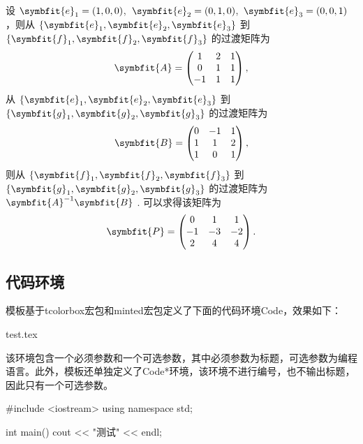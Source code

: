 \documentclass{gunote}
\begin{document}
\begin{Solve}
  设 $\symbfit{e}_1=(1,0,0)$,\ $\symbfit{e}_2=(0,1,0)$,\ $\symbfit{e}_3=(0,0,1)$ ，则从 $\{\symbfit{e}_1,\symbfit{e}_2,\symbfit{e}_3\}$ 到 $\{\symbfit{f}_1,\symbfit{f}_2,\symbfit{f}_3\}$ 的过渡矩阵为
  \[
    \symbfit{A}=\begin{pmatrix}
      1 & 2 & 1 \\
      0 & 1 & 1 \\
      -1& 1 & 1
    \end{pmatrix},
  \]
  从 $\{\symbfit{e}_1,\symbfit{e}_2,\symbfit{e}_3\}$ 到  $\{\symbfit{g}_1,\symbfit{g}_2,\symbfit{g}_3\}$ 的过渡矩阵为
  \[
    \symbfit{B}=\begin{pmatrix}
      0 & -1 & 1 \\
      1 & 1  & 2 \\
      1 & 0  & 1
    \end{pmatrix},
  \]
  则从 $\{\symbfit{f}_1,\symbfit{f}_2,\symbfit{f}_3\}$ 到  $\{\symbfit{g}_1,\symbfit{g}_2,\symbfit{g}_3\}$ 的过渡矩阵为 $\symbfit{A}^{-1}\symbfit{B}$ . 可以求得该矩阵为
  \[
    \symbfit{P}=\begin{pmatrix}
      0 & 1 & 1 \\
      -1&-3 &-2 \\
      2 & 4 & 4
    \end{pmatrix}.
  \]
\end{Solve}
\subsection{代码环境}
模板基于\textsf{tcolorbox}宏包和\textsf{minted}宏包定义了下面的代码环境\textsf{Code}，效果如下：
\begin{Code}{test.tex}
\end{Code}

该环境包含一个必须参数和一个可选参数，其中必须参数为标题，可选参数为编程语言。此外，模板还单独定义了\textsf{Code*}环境，该环境不进行编号，也不输出标题，因此只有一个可选参数。
\begin{Code*}[cpp]
#include <iostream>
using namespace std;

int main() {
  cout << "测试" << endl;
}
\end{Code*}
\end{document}
